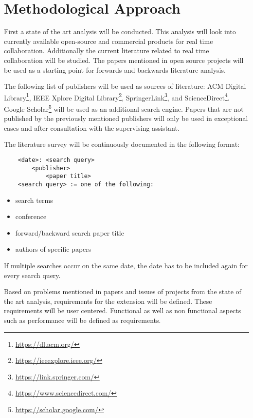 \chapter{Methodological Approach}

First a state of the art analysis will be conducted. This analysis will look into currently available open-source and commercial products for real time collaboration. 
Additionally the current literature related to real time collaboration will be studied.
The papers mentioned in open source projects will be used as a starting point for forwards and backwards literature analysis.


The following list of publishers will be used as sources of literature: ACM Digital Library\footnote{\href{https://dl.acm.org/}{https://dl.acm.org/}}, IEEE Xplore Digital Library\footnote{\href{https://ieeexplore.ieee.org/}{https://ieeexplore.ieee.org/}}, SpringerLink\footnote{\href{https://link.springer.com/}{https://link.springer.com/}}, and ScienceDirect\footnote{\href{https://www.sciencedirect.com/}{https://www.sciencedirect.com/}}. Google Scholar\footnote{\href{https://scholar.google.com/}{https://scholar.google.com/}} will be used as an additional search engine. Papers that are not published by the previously mentioned publishers will only be used in exceptional cases and after consultation with the supervising assistant.


The literature survey will be continuously documented in the following format:

\begin{lstlisting}
	<date>: <search query>
		<publisher>
			<paper title>
	<search query> := one of the following:
\end{lstlisting}

\begin{itemize}
    \item search terms
    \item conference
    \item forward/backward search paper title
    \item authors of specific papers 
\end{itemize}
If multiple searches occur on the same date, the date has to be included again for every search query.

Based on problems mentioned in papers and issues of projects from the state of the art analysis, requirements for the extension will be defined.
These requirements will be user centered.
Functional as well as non functional aspects such as performance will be defined as requirements.

